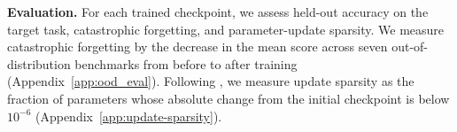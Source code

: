 \documentclass{article} %
\theoremstyle{plain}
\theoremstyle{definition}
\theoremstyle{remark}
\begin{document}


\textbf{Evaluation.}
For each trained checkpoint, we assess held-out accuracy on the target task, catastrophic forgetting, and parameter-update sparsity.
We measure catastrophic forgetting by the decrease in the mean score across seven out-of-distribution benchmarks from before to after training (Appendix~\ref{app:ood_eval}).
Following \citet{mukherjee_reinforcement_2025}, we measure update sparsity as the fraction of parameters whose absolute change from the initial checkpoint is below $10^{-6}$ (Appendix~\ref{app:update-sparsity}).


\end{document}
